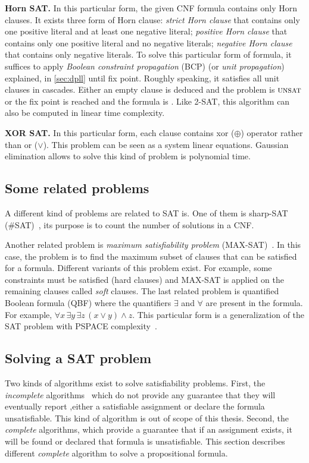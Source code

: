 \textbf{Horn SAT.}\cite{dowling1984linear} In this particular form, the given CNF formula contains only Horn clauses. It exists three form
of Horn clause: \emph{strict Horn clause} that contains only one positive literal and at least one negative literal;
\emph{positive Horn clause} that contains only one positive literal and no negative literals;
\emph{negative Horn clause} that contains only negative literals.
To solve this particular form of formula, it suffices to  apply \emph{Boolean constraint propagation} (BCP) (or \emph{unit propagation}) explained, in \cref{sec:dpll} until fix point.
Roughly speaking, it satisfies all unit clauses in cascades. Either an empty clause is deduced and the problem
is $\textsc{unsat}$ or the fix point is reached and the formula is \sat. Like 2-SAT, this algorithm can also be computed
in linear time complexity.

\textbf{XOR SAT.}\cite{moore2011nature} In this particular form, each clause contains xor ($\oplus$) operator rather than or ($\lor$).
This problem can be seen as a system linear equations. Gaussian elimination allows to solve this kind of
problem is polynomial time.
\subsection{Some related problems}

A different kind of problems are related to SAT is.%
One of them is sharp-SAT (\#SAT)~\cite{valiant1979complexity}, its purpose is to count the number of solutions in a CNF.

Another related problem is \textit{maximum satisfiability problem} (MAX-SAT)~\cite{biere2009handbook}. In this case, the problem
is to find the maximum subset of clauses that can be satisfied for a formula. Different variants
of this problem exist. For example, some constraints must be satisfied (hard clauses) and MAX-SAT
is applied on the remaining clauses called \emph{soft} clauses.
The last related problem is quantified Boolean formula (QBF) where the quantifiers $\exists$ and
$\forall$ are present in the formula. For example, $\forall x\, \exists y\, \exists z \, (x \lor y) \land z$.
This particular form is a generalization of the SAT problem with PSPACE complexity~\cite{garey2002computers}.
\subsection{Solving a SAT problem}
Two kinds of algorithms exist to solve satisfiability problems.
First, the \emph{incomplete} algorithms~\cite{kautz2009incomplete} which do not provide any guarantee that they will eventually report ,either a satisfiable assignment or declare the formula unsatisfiable. This kind of algorithm is out of scope of this thesis. 
Second, the \emph{complete} algorithms, which provide a guarantee that if an assignment exists,
it will be found or declared that formula is unsatisfiable.
This section describes different \emph{complete }algorithm to solve a propositional formula.

